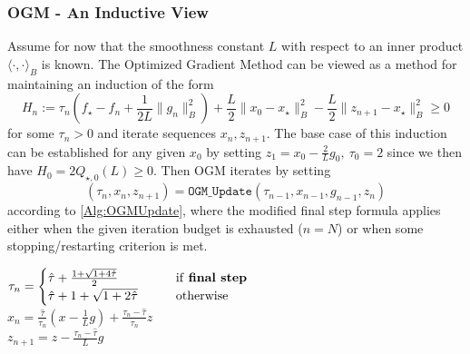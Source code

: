 \documentclass[11pt]{article}
\numberwithin{equation}{section}
\newcommand{\normB}[1]{\|{#1}\|_B}
\theoremstyle{definition}
\theoremstyle{plain}
\theoremstyle{definition}
\begin{document}
\subsubsection{OGM - An Inductive View}  \label{SubSec:OGM}
Assume for now that the smoothness constant $L$ with respect to an inner product $\langle \cdot,\cdot \rangle_B$ is known. The Optimized Gradient Method \cite{OGM} can be viewed as a method for maintaining an induction of the form
\begin{equation*}
H_n := \tau_n \left(f_\star - f_n + \frac{1}{2L}\normB{g_n}^2\right) + \frac{L}{2}\normB{x_0-x_\star}^2 - \frac{L}{2}\normB{z_{n+1}-x_\star}^2 \geq 0
\end{equation*}
for some $\tau_n >0$ and iterate sequences $x_n,z_{n+1}$. The base case of this induction can be established for any given $x_0$ by setting
$ z_{1} = x_0 - \frac{2}{L} g_0,\ \tau_0 = 2 $
since we then have
$ H_0 = 2Q_{\star, 0}(L) \geq 0 . $
Then OGM iterates by setting
\begin{equation}
    (\tau_n, x_n, z_{n+1}) = \texttt{OGM\_Update}(\tau_{n-1}, x_{n-1}, g_{n-1}, z_n)
\end{equation}
according to \cref{Alg:OGMUpdate}, where the modified final step formula applies either when the given iteration budget is exhausted ($n=N$) or when some stopping/restarting criterion is met.

\begin{algorithm}
    \caption{OGM Update Procedure} \label{Alg:OGMUpdate}
        {
        $\tau_n = \begin{cases}
            \hat{\tau} + \frac{1 + \sqrt{1+ 4\hat{\tau}}}{2} \qquad & \text{if \textbf{final step}} \\
            \hat{\tau} + 1 + \sqrt{1+2\hat{\tau}} \qquad & \text{otherwise}
        \end{cases}$  \\
        $x_n = \frac{\hat{\tau}}{\tau_n} (x - \frac{1}{L} g) + \frac{\tau_n - \hat{\tau}}{\tau_n}z$\\
        $z_{n+1} = z - \frac{\tau_{n}-\hat{\tau}}{L}g$ \\
        }
\end{algorithm}
\end{document}
